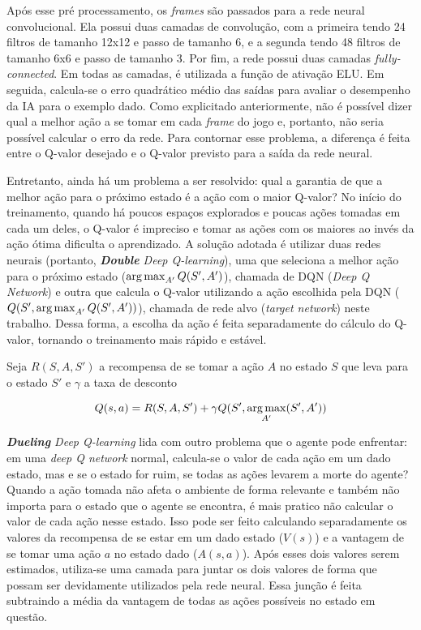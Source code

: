 Após esse pré processamento, os \textit{frames} são passados para a rede neural convolucional. Ela possui duas camadas de convolução, com a primeira tendo 24 filtros de tamanho 12x12 e passo de tamanho 6, e a segunda tendo 48 filtros de tamanho 6x6 e passo de tamanho 3.
Por fim, a rede possui duas camadas \textit{fully-connected}.
Em todas as camadas, é utilizada a função de ativação ELU.
Em seguida, calcula-se o erro quadrático médio das saídas para avaliar o desempenho da IA para o exemplo dado.
Como explicitado anteriormente, não é possível dizer qual a melhor ação a se tomar em cada \textit{frame} do jogo e, portanto, não seria possível calcular o erro da rede.
Para contornar esse problema, a diferença é feita entre o Q-valor desejado
e o Q-valor previsto para a saída da rede neural.

Entretanto, ainda há um problema a ser resolvido: qual a garantia de que a melhor ação para o próximo estado é a ação com o maior Q-valor?
No início do treinamento, quando há poucos espaços explorados e poucas ações tomadas em cada um deles, o Q-valor é impreciso e tomar as ações com os maiores ao invés da ação ótima dificulta o aprendizado.
A solução adotada é utilizar duas redes neurais (portanto, \textit{\textbf{Double} Deep Q-learning}), uma que seleciona a melhor ação para o próximo estado ($\operatorname*{arg\,max}_{A'}Q(S',A')$), chamada de DQN (\textit{Deep Q Network}) e outra que calcula o Q-valor utilizando a ação escolhida pela DQN ($Q(S', \operatorname*{arg\,max}_{A'}Q(S',A'))$), chamada de rede alvo (\textit{target network}) neste trabalho. Dessa forma, a escolha da ação é feita separadamente do cálculo do Q-valor, tornando o treinamento mais rápido e estável.

Seja $R(S,A,S')$ a recompensa de se tomar a ação $A$ no estado $S$ que leva para o estado $S'$ e $\gamma$ a taxa de desconto

\begin{equation} \label{eq:doubledqn}
Q(s,a) = R(S,A,S') + \gamma Q(S', \operatorname*{arg\,max}_{A'}(S',A'))
\end{equation}

\textit{\textbf{Dueling} Deep Q-learning} lida com outro problema que o agente pode enfrentar: em uma \textit{deep Q network} normal, calcula-se o valor de cada ação em um dado estado, mas e se o estado for ruim, se todas as ações levarem a morte do agente?
Quando a ação tomada não afeta o ambiente de forma relevante e também não importa para o estado que o agente se encontra, é mais pratico não calcular o valor de cada ação nesse estado.
Isso pode ser feito calculando separadamente os valores da recompensa de se estar em um dado estado ($V(s)$) e a vantagem de se tomar uma ação $a$ no estado dado ($A(s,a)$).
Após esses dois valores serem estimados, utiliza-se uma camada para juntar os dois valores de forma que possam ser devidamente utilizados pela rede neural.
Essa junção é feita subtraindo a média da vantagem de todas as ações possíveis no estado em questão.

